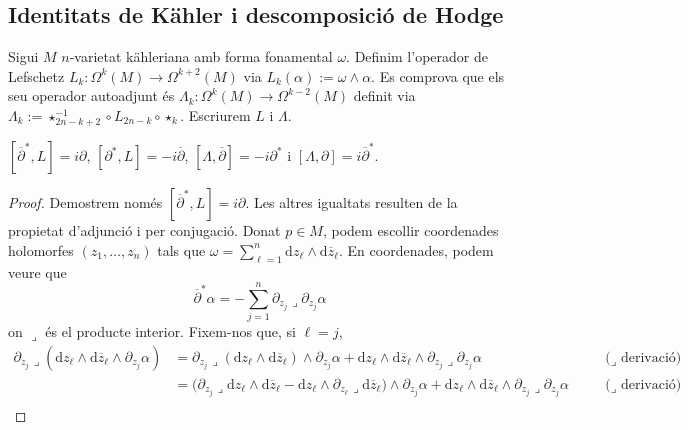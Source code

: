 \subsection{Identitats de Kähler i descomposició de Hodge}
Sigui $M$ $n$-varietat kähleriana amb forma fonamental $\omega$. Definim l'operador de Lefschetz $L_{k}:\Omega^{k}(M)\rightarrow\Omega^{k+2}(M)$ via $L_{k}(\alpha):=\omega\wedge\alpha$. Es comprova que els seu operador autoadjunt és $\Lambda_{k}:\Omega^{k}(M)\rightarrow\Omega^{k-2}(M)$ definit via $\Lambda_{k}:=\star_{2n-k+2}^{-1}\circ L_{2n-k}\circ\star_{k}$. Escriurem $L$ i $\Lambda$.
\begin{proposicio}
    $[\overline{\partial}^{*},L]=i\partial$, $[\partial^{*},L]=-i\overline{\partial}$, $[\Lambda,\overline{\partial}]=-i\partial^{*}$ i $[\Lambda,\partial]=i\overline{\partial}^{*}$.
    \begin{proof}
        Demostrem només $[\overline{\partial}^{*},L]=i\partial$. Les altres igualtats resulten de la propietat d'adjunció i per conjugació.\newline
        Donat $p\in M$, podem escollir coordenades holomorfes $(z_{1},\ldots,z_{n})$ tals que $\omega=\sum_{\ell=1}^{n}\textrm{d}z_{\ell}\wedge\textrm{d}\overline{z}_{\ell}$. En coordenades, podem veure que
        \begin{equation*}
            \overline{\partial}^{*}\alpha
            =-\sum_{j=1}^{n}\partial_{z_{j}}\lrcorner\partial_{z_{j}}\alpha
        \end{equation*}
        on $\lrcorner$ és el producte interior. Fixem-nos que, si $\ell=j$,
        \begin{align*}
            \partial_{z_{j}}\lrcorner(\textrm{d}z_{\ell}\wedge\textrm{d}\overline{z}_{\ell}\wedge\partial_{z_{j}}\alpha)
            &=\partial_{z_{j}}\lrcorner(\textrm{d}z_{\ell}\wedge\textrm{d}\overline{z}_{\ell})\wedge\partial_{z_{j}}\alpha
            +
            \textrm{d}z_{\ell}\wedge\textrm{d}\overline{z}_{\ell}\wedge
            \partial_{z_{j}}\lrcorner\partial_{z_{j}}\alpha
            &\quad&\textrm{($\lrcorner$ derivació)}\\
            &=\big(\partial_{z_{j}}\lrcorner\textrm{d}z_{\ell}\wedge\textrm{d}\overline{z}_{\ell}
            -\textrm{d}z_{\ell}\wedge\partial_{z_{\ell}}\lrcorner\textrm{d}\overline{z}_{\ell}\big)\wedge\partial_{z_{j}}\alpha
            +\textrm{d}z_{\ell}\wedge\textrm{d}\overline{z}_{\ell}\wedge
            \partial_{z_{j}}\lrcorner\partial_{z_{j}}\alpha
            &\quad&\textrm{($\lrcorner$ derivació)}\\

\end{align*}
\end{proof}
\end{proposicio}
